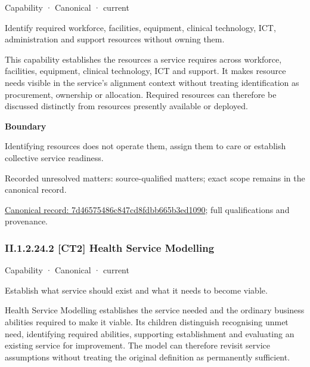 \label{element:7d46575486c847cd8fdbb665b3ed1090}
{\small Capability · Canonical · current}\par

Identify required workforce, facilities, equipment, clinical technology, ICT, administration and support resources without owning them.



This capability establishes the resources a service requires across workforce, facilities, equipment, clinical technology, ICT and support. It makes resource needs visible in the service's alignment context without treating identification as procurement, ownership or allocation. Required resources can therefore be discussed distinctly from resources presently available or deployed.



\textbf{Boundary}



Identifying resources does not operate them, assign them to care or establish collective service readiness.


{\small Recorded unresolved matters: source-qualified matters; exact scope remains in the canonical record.}\par
{\footnotesize \href{../../../../continuum/strategy/capability/7d46575486c847cd8fdbb665b3ed1090.md}{Canonical record: 7d46575486c847cd8fdbb665b3ed1090}; full qualifications and provenance.}\par
\subsubsection*{II.1.2.24.2 [CT2] Health Service Modelling}
\label{navigation:II.1.2.24.2}

\label{element:9a3e90db97b94d1888a2a5c5effb8999}
{\small Capability · Canonical · current}\par

Establish what service should exist and what it needs to become viable.



Health Service Modelling establishes the service needed and the ordinary business abilities required to make it viable. Its children distinguish recognising unmet need, identifying required abilities, supporting establishment and evaluating an existing service for improvement. The model can therefore revisit service assumptions without treating the original definition as permanently sufficient.



